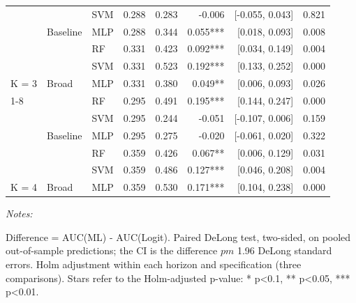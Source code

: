 \begin{table}
\begin{threeparttable}
\begin{tabular}[t]{lllrrrrr}
 &  & SVM & 0.288 & 0.283 & -0.006 & {}[-0.055, 0.043] & 0.821\\

 & \multirow[t]{-2}{*}[\normalbaselineskip]{\raggedright\arraybackslash Baseline} & MLP & 0.288 & 0.344 & 0.055*** & {}[0.018, 0.093] & 0.008\\

 &  & RF & 0.331 & 0.423 & 0.092*** & {}[0.034, 0.149] & 0.004\\

 &  & SVM & 0.331 & 0.523 & 0.192*** & {}[0.133, 0.252] & 0.000\\

\multirow[t]{-5}{*}[\normalbaselineskip]{\raggedright\arraybackslash K = 3} & \multirow[t]{-2}{*}[\normalbaselineskip]{\raggedright\arraybackslash Broad} & MLP & 0.331 & 0.380 & 0.049** & {}[0.006, 0.093] & 0.026\\
\cmidrule{1-8}
 &  & RF & 0.295 & 0.491 & 0.195*** & {}[0.144, 0.247] & 0.000\\

 &  & SVM & 0.295 & 0.244 & -0.051 & {}[-0.107, 0.006] & 0.159\\

 & \multirow[t]{-2}{*}[\normalbaselineskip]{\raggedright\arraybackslash Baseline} & MLP & 0.295 & 0.275 & -0.020 & {}[-0.061, 0.020] & 0.322\\

 &  & RF & 0.359 & 0.426 & 0.067** & {}[0.006, 0.129] & 0.031\\

 &  & SVM & 0.359 & 0.486 & 0.127*** & {}[0.046, 0.208] & 0.004\\

\multirow[t]{-5}{*}[\normalbaselineskip]{\raggedright\arraybackslash K = 4} & \multirow[t]{-2}{*}[\normalbaselineskip]{\raggedright\arraybackslash Broad} & MLP & 0.359 & 0.530 & 0.171*** & {}[0.104, 0.238] & 0.000\\
\bottomrule
\end{tabular}
\begin{tablenotes}
\item \textit{Notes: } 
\item Difference = AUC(ML) - AUC(Logit). Paired DeLong test, two-sided, on pooled out-of-sample predictions; the CI is the difference $pm$ 1.96 DeLong standard errors. Holm adjustment within each horizon and specification (three comparisons). Stars refer to the Holm-adjusted p-value: * p<0.1, ** p<0.05, *** p<0.01.
\end{tablenotes}
\end{threeparttable}
\end{table}
